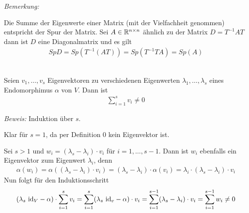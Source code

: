 \textit{Bemerkung:}

Die Summe der Eigenwerte einer Matrix (mit der Vielfachheit genommen) entspricht der Spur der Matrix. Sei $A\in \mathbb{R}^{n \times n}$ ähnlich zu der 
Matrix $D=T^{-1}AT$ dann ist $D$ eine Diagonalmatrix und es gilt
\begin{align*}
    Sp D = Sp(T^{-1}(AT))=Sp(T^{-1}TA)=Sp(A)
\end{align*}
\begin{mylemma}\label{lemdiag}\ \\
    Seien $v_1,\ldots,v_s$ Eigenvektoren zu verschiedenen Eigenwerten $\lambda_1,\ldots,\lambda_s$ eines Endomorphimus $\alpha$ von $V$. Dann ist
    \begin{align*}
        \sum_{i=1}^s v_i \neq 0
    \end{align*}

    \textit{Beweis:}
    Induktion über $s$.
    
    Klar für $s=1$, da per Definition $0$ kein Eigenvektor ist.
    
    Sei $s>1$ und $w_i=(\lambda_s-\lambda_i)\cdot v_i$ für $i=1,\ldots,s-1$. Dann ist $w_i$ ebenfalls ein Eigenvektor zum Eigenwert $\lambda_i$, denn
    \begin{align*}
        \alpha(w_i)=\alpha((\lambda_s-\lambda_i)\cdot v_i)=(\lambda_s-\lambda_i)\cdot \alpha(v_i)= \lambda_i\cdot (\lambda_s-\lambda_i)\cdot v_i
    \end{align*}
    Nun folgt für den Induktionsschritt
    \begin{align*}
        (\lambda_s\mbox{ id}_V - \alpha)\cdot \sum_{i=1}^s v_i = \sum_{i=1}^s (\lambda_s\mbox{ id}_v - \alpha)\cdot v_i
        =\sum_{i=1}^{s-1} (\lambda_s-\lambda_i)\cdot v_i = \sum_{i=1}^{s-1} w_i \neq 0
    \end{align*}
\end{mylemma}

